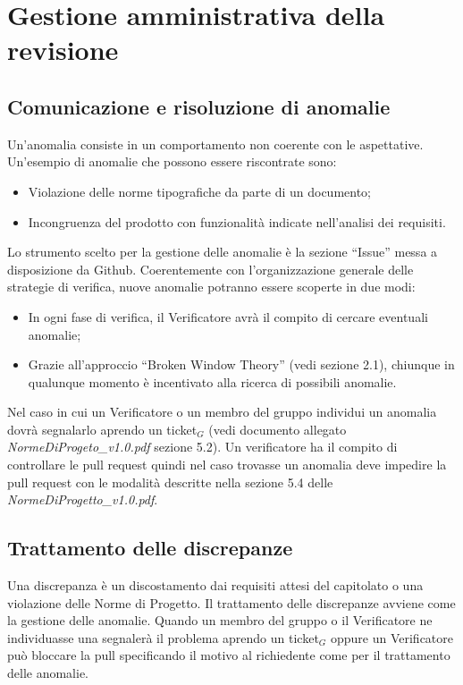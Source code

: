 \section{Gestione amministrativa della revisione}
\subsection{Comunicazione e risoluzione di anomalie}
Un'anomalia consiste in un comportamento non coerente con le aspettative. Un'esempio di anomalie che possono essere riscontrate sono:
\begin{itemize}
	\item Violazione delle norme tipografiche da parte di un documento;
	\item Incongruenza del prodotto con funzionalità indicate nell'analisi dei requisiti.
\end{itemize}
Lo strumento scelto per la gestione delle anomalie è la sezione ``Issue'' messa a disposizione da Github. Coerentemente con l'organizzazione generale delle strategie di verifica, nuove anomalie potranno essere scoperte in due modi:

\begin{itemize}
	\item In ogni fase di verifica, il Verificatore avrà il compito di cercare eventuali anomalie;
	\item Grazie all'approccio ``Broken Window Theory'' (vedi sezione 2.1), chiunque in qualunque momento è incentivato alla ricerca di possibili anomalie.
\end{itemize}
Nel caso in cui un Verificatore o un membro del gruppo individui un anomalia dovrà segnalarlo aprendo un ticket$_G$ (vedi documento allegato \textit{NormeDiProgeto\_v1.0.pdf} sezione 5.2). Un verificatore ha il compito di controllare le pull request quindi nel caso trovasse un anomalia deve impedire la pull request con le modalità descritte nella sezione 5.4 delle \textit{NormeDiProgetto\_v1.0.pdf}.

\subsection{Trattamento delle discrepanze}
Una discrepanza è un discostamento dai requisiti attesi del capitolato o una violazione delle Norme di Progetto. Il trattamento delle discrepanze avviene come la gestione delle anomalie. Quando un membro del gruppo o il Verificatore ne individuasse una segnalerà il problema aprendo un ticket$_G$ oppure un Verificatore può bloccare la pull specificando il motivo al richiedente come per il trattamento delle anomalie.
